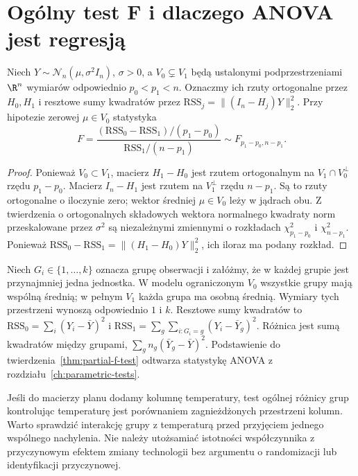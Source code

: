 \section{Ogólny test F i dlaczego ANOVA jest regresją}
\begin{twierdzenie}
\label{thm:partial-f-test}
Niech $Y\sim\mathcal N_n(\mu,\sigma^2I_n)$,
$\sigma>0$, a $V_0\subsetneq V_1$ będą ustalonymi
podprzestrzeniami $\R^n$ wymiarów odpowiednio
$p_0<p_1<n$. Oznaczmy ich rzuty ortogonalne przez
$H_0,H_1$ i resztowe sumy kwadratów przez
$\mathrm{RSS}_j=\|(I_n-H_j)Y\|_2^2$.
Przy hipotezie zerowej $\mu\in V_0$ statystyka
\[
 F=\frac{(\mathrm{RSS}_0-\mathrm{RSS}_1)/(p_1-p_0)}
 {\mathrm{RSS}_1/(n-p_1)}\sim F_{p_1-p_0,n-p_1}.
\]
\end{twierdzenie}
\begin{proof}
Ponieważ $V_0\subset V_1$, macierz $H_1-H_0$ jest
rzutem ortogonalnym na $V_1\cap V_0^\perp$ rzędu
$p_1-p_0$. Macierz $I_n-H_1$ jest rzutem na
$V_1^\perp$ rzędu $n-p_1$. Są to rzuty ortogonalne
o iloczynie zero; wektor średniej $\mu\in V_0$ leży
w jądrach obu. Z twierdzenia o ortogonalnych składowych
wektora normalnego kwadraty norm przeskalowane przez
$\sigma^2$ są niezależnymi zmiennymi o rozkładach
$\chi^2_{p_1-p_0}$ i $\chi^2_{n-p_1}$.
Ponieważ $\mathrm{RSS}_0-\mathrm{RSS}_1
=\|(H_1-H_0)Y\|_2^2$, ich iloraz ma podany rozkład.
\end{proof}

\begin{przyklad}
Niech $G_i\in\{1,\ldots,k\}$ oznacza grupę obserwacji
i załóżmy, że w każdej grupie jest przynajmniej jedna
jednostka. W modelu ograniczonym $V_0$ wszystkie grupy
mają wspólną średnią; w pełnym $V_1$ każda grupa ma
osobną średnią. Wymiary tych przestrzeni wynoszą
odpowiednio $1$ i $k$. Resztowe sumy kwadratów to
$\mathrm{RSS}_0=\sum_i(Y_i-\bar Y)^2$ i
$\mathrm{RSS}_1=\sum_g\sum_{i:G_i=g}(Y_i-\bar Y_g)^2$.
Różnica jest sumą kwadratów między grupami,
$\sum_gn_g(\bar Y_g-\bar Y)^2$.
Podstawienie do twierdzenia~\ref{thm:partial-f-test}
odtwarza statystykę ANOVA z rozdziału~\ref{ch:parametric-tests}.
\end{przyklad}

\begin{uwaga}
Jeśli do macierzy planu dodamy kolumnę temperatury,
test ogólnej różnicy grup kontrolując temperaturę jest
porównaniem zagnieżdżonych przestrzeni kolumn. Warto
sprawdzić interakcję grupy z temperaturą przed przyjęciem
jednego wspólnego nachylenia. Nie należy utożsamiać
istotności współczynnika z przyczynowym efektem
zmiany technologii bez argumentu o randomizacji
lub identyfikacji przyczynowej.
\end{uwaga}

